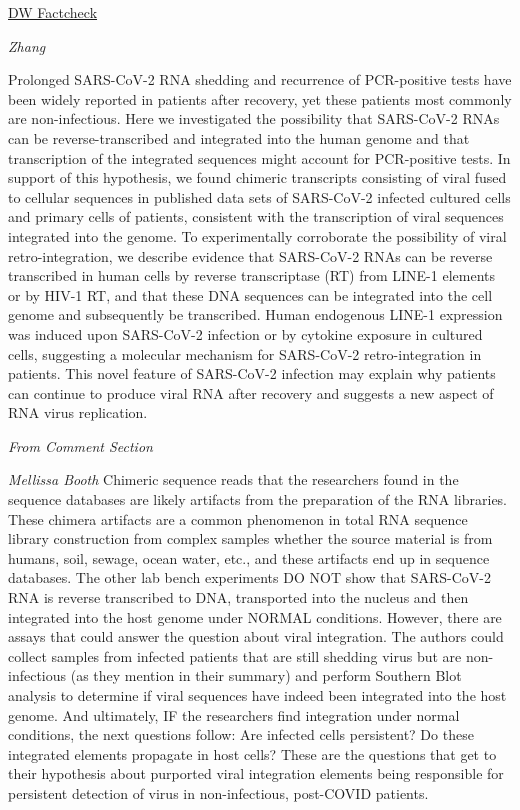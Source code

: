 \documentclass[
]{book}
\begin{document}
\href{https://www.dw.com/en/dw-fact-check-four-coronavirus-vaccination-myths-examined/a-57243165}{DW Factcheck}

\emph{Zhang}

Prolonged SARS-CoV-2 RNA shedding and recurrence of PCR-positive tests have been widely reported in patients after recovery, yet these patients most commonly are non-infectious. Here we investigated the possibility that SARS-CoV-2 RNAs can be reverse-transcribed and integrated into the human genome and that transcription of the integrated sequences might account for PCR-positive tests. In support of this hypothesis, we found chimeric transcripts consisting of viral fused to cellular sequences in published data sets of SARS-CoV-2 infected cultured cells and primary cells of patients, consistent with the transcription of viral sequences integrated into the genome. To experimentally corroborate the possibility of viral retro-integration, we describe evidence that SARS-CoV-2 RNAs can be reverse transcribed in human cells by reverse transcriptase (RT) from LINE-1 elements or by HIV-1 RT, and that these DNA sequences can be integrated into the cell genome and subsequently be transcribed. Human endogenous LINE-1 expression was induced upon SARS-CoV-2 infection or by cytokine exposure in cultured cells, suggesting a molecular mechanism for SARS-CoV-2 retro-integration in patients. This novel feature of SARS-CoV-2 infection may explain why patients can continue to produce viral RNA after recovery and suggests a new aspect of RNA virus replication.

\emph{From Comment Section}

\emph{Mellissa Booth}
Chimeric sequence reads that the researchers found in the sequence databases are likely artifacts from the preparation of the RNA libraries. These chimera artifacts are a common phenomenon in total RNA sequence library construction from complex samples whether the source material is from humans, soil, sewage, ocean water, etc., and these artifacts end up in sequence databases. The other lab bench experiments DO NOT show that SARS-CoV-2 RNA is reverse transcribed to DNA, transported into the nucleus and then integrated into the host genome under NORMAL conditions. However, there are assays that could answer the question about viral integration. The authors could collect samples from infected patients that are still shedding virus but are non-infectious (as they mention in their summary) and perform Southern Blot analysis to determine if viral sequences have indeed been integrated into the host genome. And ultimately, IF the researchers find integration under normal conditions, the next questions follow: Are infected cells persistent? Do these integrated elements propagate in host cells? These are the questions that get to their hypothesis about purported viral integration elements being responsible for persistent detection of virus in non-infectious, post-COVID patients.
\end{document}
